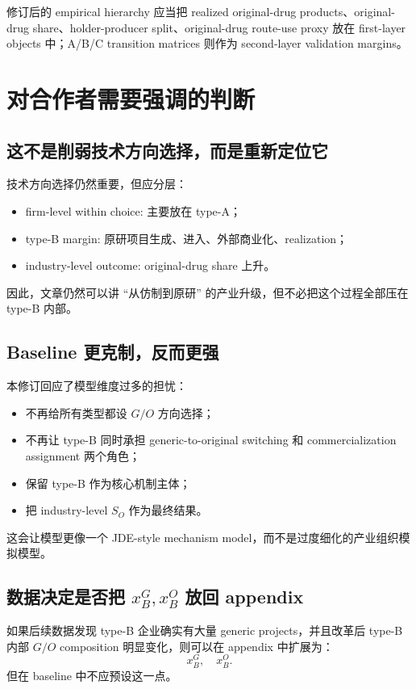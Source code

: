 \documentclass[12pt]{article}
\begin{document}
修订后的 empirical hierarchy 应当把 realized original-drug products、original-drug share、holder-producer split、original-drug route-use proxy 放在 first-layer objects 中；A/B/C transition matrices 则作为 second-layer validation margins。

\section{对合作者需要强调的判断}

\subsection{这不是削弱技术方向选择，而是重新定位它}

技术方向选择仍然重要，但应分层：
\begin{itemize}
    \item firm-level within choice: 主要放在 type-A；
    \item type-B margin: 原研项目生成、进入、外部商业化、realization；
    \item industry-level outcome: original-drug share 上升。
\end{itemize}

因此，文章仍然可以讲 ``从仿制到原研'' 的产业升级，但不必把这个过程全部压在 type-B 内部。

\subsection{Baseline 更克制，反而更强}

本修订回应了模型维度过多的担忧：
\begin{itemize}
    \item 不再给所有类型都设 $G/O$ 方向选择；
    \item 不再让 type-B 同时承担 generic-to-original switching 和 commercialization assignment 两个角色；
    \item 保留 type-B 作为核心机制主体；
    \item 把 industry-level $S_O$ 作为最终结果。
\end{itemize}

这会让模型更像一个 JDE-style mechanism model，而不是过度细化的产业组织模拟模型。

\subsection{数据决定是否把 $x_B^G,x_B^O$ 放回 appendix}

如果后续数据发现 type-B 企业确实有大量 generic projects，并且改革后 type-B 内部 $G/O$ composition 明显变化，则可以在 appendix 中扩展为：
\[
x_B^G,\quad x_B^O.
\]
但在 baseline 中不应预设这一点。
\end{document}
